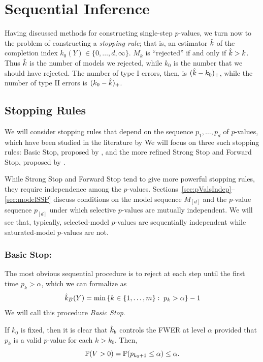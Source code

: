 \documentclass{article}
\begin{document}
\section{Sequential Inference}\label{sec:sequential}

Having discussed methods for constructing single-step $p$-values, we turn now to the problem of constructing a {\em stopping rule}; that is, an estimator $\hk$ of the completion index $k_0(Y)\in \{0,\ldots,d,\infty\}$. $M_k$ is ``rejected'' if and only if $\hk>k$. Thus $\hk$ is the number of models we rejected, while $k_0$ is the number that we should have rejected. The number of type I errors, then, is $(\hk-k_0)_+$, while the number of type II errors is $(k_0-\hk)_+$. 

\subsection{Stopping Rules}

We will consider stopping rules that depend on the sequence $p_1,\ldots,p_d$ of $p$-values, which have been studied in the literature by  We will focus on three such stopping rules: Basic Stop, proposed by , and the more refined Strong Stop and Forward Stop, proposed by \citet{gsell2013sequential}. 

While Strong Stop and Forward Stop tend to give more powerful stopping rules, they require independence among the $p$-values. Sections~\ref{sec:pValsIndep}--\ref{sec:modelSSP} discuss conditions on the model sequence $M_{[d]}$ and the $p$-value sequence $p_{[d]}$ under which selective $p$-values are mutually independent. We will see that, typically, selected-model $p$-values are sequentially independent while saturated-model $p$-values are not.

\subsubsection{Basic Stop:}


The most obvious sequential procedure is to reject at each step until the first time $p_k > \alpha$, which we can formalize as
\[
\hk_B(Y) = \min\left\{k \in \{1,\ldots,m\} :\;
  p_k > \alpha\right\} - 1
\]
We will call this procedure {\em Basic Stop}. 

If $k_0$ is fixed, then it is clear that $\hk_b$ controls the FWER at level $\alpha$ provided that $p_{k}$ is a valid $p$-value for each $k>k_0$. Then, 
\[
\P(V>0) = \P(p_{k_0+1} \leq \alpha) \leq \alpha.
\]
\end{document}
